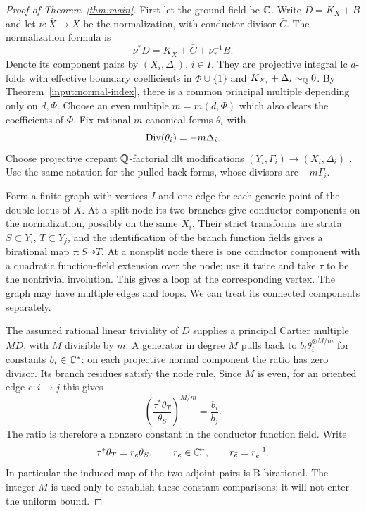 \begin{proof}[Proof of Theorem~\ref{thm:main}]
 First let the ground field be $\mathbb C$.  Write $D=K_X+B$ and let
 $\nu:\bar X\to X$ be the normalization, with conductor divisor
 $\bar C$.  The normalization formula is
 \[
  \nu^*D=K_{\bar X}+\bar C+\nu_*^{-1}B.
 \]
 Denote its component pairs by $(X_i,\Delta_i)$, $i\in I$.
 They are projective integral lc $d$-folds with effective boundary
 coefficients in $\Phi\cup\{1\}$ and
 $K_{X_i}+\Delta_i\sim_\mathbb Q0$.  By
 Theorem~\ref{input:normal-index}, there is a common principal multiple
 depending only on $d,\Phi$.  Choose an even multiple
 $m=m(d,\Phi)$ which also clears the coefficients of $\Phi$.
 Fix rational $m$-canonical forms $\theta_i$ with
 \[
  \operatorname{Div}(\theta_i)=-m\Delta_i.
 \]
 Choose projective crepant $\mathbb Q$-factorial dlt modifications
 $(Y_i,\Gamma_i)\to(X_i,\Delta_i)$
 \citep[Proposition~5]{KollarSources}.
 Use the same notation for the pulled-back forms, whose divisors are
 $-m\Gamma_i$.

 Form a finite graph with vertices $I$ and one edge for each generic
 point of the double locus of $X$.  At a split node its two branches
 give conductor components on the normalization, possibly on the
 same $X_i$.  Their strict transforms are strata $S\subset Y_i$,
 $T\subset Y_j$, and the identification of the branch function
 fields gives a birational map $\tau:S\dashrightarrow T$.
 At a nonsplit node there is one conductor component with a quadratic
 function-field extension over the node; use it twice and take
 $\tau$ to be the nontrivial involution.  This gives a loop at the
 corresponding vertex.  The graph may have multiple edges and
 loops.  We can treat its connected components separately.

 The assumed rational linear triviality of $D$ supplies a principal
 Cartier multiple $MD$, with $M$ divisible by $m$.  A generator in
 degree $M$ pulls back to
 $b_i\theta_i^{\otimes M/m}$ for constants $b_i\in\mathbb C^*$: on each
 projective normal component the ratio has zero divisor.  Its
 branch residues satisfy the node rule.  Since $M$ is even, for
 an oriented edge $e:i\to j$ this gives
 \[
  \left(\frac{\tau^*\theta_T}{\theta_S}\right)^{M/m}
  =\frac{b_i}{b_j}.
 \]
 The ratio is therefore a nonzero constant in the conductor
 function field.  Write
 \begin{equation}\label{res:edge}
  \tau^*\theta_T=r_e\theta_S,
  \qquad r_e\in\mathbb C^*,\qquad r_{\bar e}=r_e^{-1}.
 \end{equation}
 In particular the induced map of the two adjoint pairs is
 B-birational.  The integer $M$ is used only to establish these
 constant comparisons; it will not enter the uniform bound.


\end{proof}
